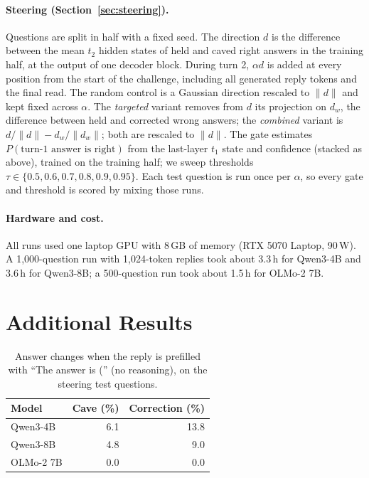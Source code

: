 \paragraph{Steering (Section~\ref{sec:steering}).}
Questions are split in half with a fixed seed. The direction $d$ is the difference between the mean $t_2$ hidden states of held and caved right answers in the training half, at the output of one decoder block. During turn 2, $\alpha d$ is added at every position from the start of the challenge, including all generated reply tokens and the final read. The random control is a Gaussian direction rescaled to $\lVert d\rVert$ and kept fixed across $\alpha$. The \emph{targeted} variant removes from $d$ its projection on $d_w$, the difference between held and corrected wrong answers; the \emph{combined} variant is $d/\lVert d\rVert - d_w/\lVert d_w\rVert$; both are rescaled to $\lVert d\rVert$. The gate estimates $P(\text{turn-1 answer is right})$ from the last-layer $t_1$ state and confidence (stacked as above), trained on the training half; we sweep thresholds $\tau\in\{0.5,0.6,0.7,0.8,0.9,0.95\}$. Each test question is run once per $\alpha$, so every gate and threshold is scored by mixing those runs.

\paragraph{Hardware and cost.}
All runs used one laptop GPU with 8\,GB of memory (RTX 5070 Laptop, 90\,W). A 1{,}000-question run with 1{,}024-token replies took about 3.3\,h for Qwen3-4B and 3.6\,h for Qwen3-8B; a 500-question run took about 1.5\,h for OLMo-2 7B.

\section{Additional Results}
\label{app:results}

\begin{table}[tbp]
\centering
\small
\caption{Answer changes when the reply is prefilled with ``The answer is ('' (no reasoning), on the steering test questions.}
\label{tab:prefill}
\begin{tabular}{lrr}
\toprule
Model & Cave (\%) & Correction (\%) \\
\midrule
Qwen3-4B & 6.1 & 13.8 \\
Qwen3-8B & 4.8 & 9.0 \\
OLMo-2 7B & 0.0 & 0.0 \\
\bottomrule
\end{tabular}
\end{table}

